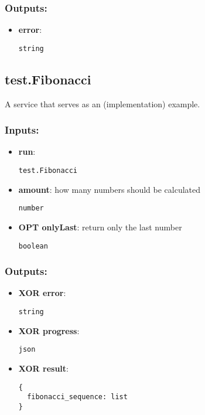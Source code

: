 \subsubsection*{Outputs:}
\begin{itemize}
    \item \textbf{error}: 
\begin{lstlisting}
string
\end{lstlisting}
  \end{itemize}

\subsection{test.Fibonacci}
\label{ch:builtinservices:test.Fibonacci}
A service that serves as an (implementation) example.
\subsubsection*{Inputs:}
\begin{itemize}
    \item \textbf{run}: 
\begin{lstlisting}
test.Fibonacci
\end{lstlisting}
    \item \textbf{amount}: how many numbers should be calculated
\begin{lstlisting}
number
\end{lstlisting}
    \item \textbf{OPT onlyLast}: return only the last number
\begin{lstlisting}
boolean
\end{lstlisting}
  \end{itemize}

\subsubsection*{Outputs:}
\begin{itemize}
    \item \textbf{XOR error}: 
\begin{lstlisting}
string
\end{lstlisting}
    \item \textbf{XOR progress}: 
\begin{lstlisting}
json
\end{lstlisting}
    \item \textbf{XOR result}: 
\begin{lstlisting}
{
  fibonacci_sequence: list
}
\end{lstlisting}
  \end{itemize}

